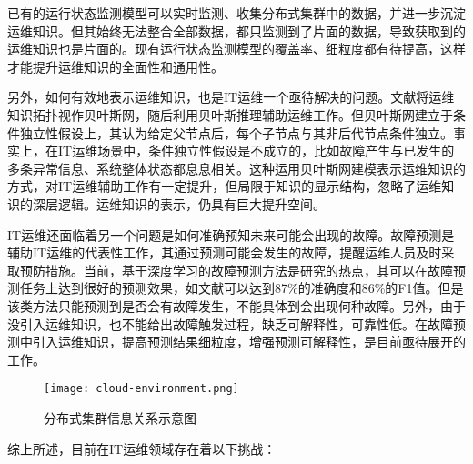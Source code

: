已有的运行状态监测模型\cite{wang2019grano,nie2016mining-causality-graph,qiu2020causality-mining-knowledge-graph}可以实时监测、收集分布式集群中的数据，并进一步沉淀运维知识。但其始终无法整合全部数据，都只监测到了片面的数据，导致获取到的运维知识也是片面的。现有运行状态监测模型的覆盖率、细粒度都有待提高，这样才能提升运维知识的全面性和通用性。

另外，如何有效地表示运维知识，也是IT运维一个亟待解决的问题。文献\parencite{nie2016mining-causality-graph,qiu2020causality-mining-knowledge-graph,tan2012prepare}将运维知识拓扑视作贝叶斯网，随后利用贝叶斯推理辅助运维工作。但贝叶斯网建立于条件独立性假设上，其认为给定父节点后，每个子节点与其非后代节点条件独立。事实上，在IT运维场景中，条件独立性假设是不成立的，比如故障产生与已发生的多条异常信息、系统整体状态都息息相关。这种运用贝叶斯网建模表示运维知识的方式，对IT运维辅助工作有一定提升，但局限于知识的显示结构，忽略了运维知识的深层逻辑。运维知识的表示，仍具有巨大提升空间。

IT运维还面临着另一个问题是如何准确预知未来可能会出现的故障。故障预测是辅助IT运维的代表性工作，其通过预测可能会发生的故障，提醒运维人员及时采取预防措施。当前，基于深度学习的故障预测方法\cite{xu2016health,cheng2018machine,du2017deeplog,das2018desh,islam2017predicting,li2020predicting,gao2020task}是研究的热点，其可以在故障预测任务上达到很好的预测效果，如文献\parencite{gao2020task}可以达到87\%的准确度和86\%的F1值。但是该类方法只能预测到是否会有故障发生，不能具体到会出现何种故障。另外，由于没引入运维知识，也不能给出故障触发过程，缺乏可解释性，可靠性低。在故障预测中引入运维知识，提高预测结果细粒度，增强预测可解释性，是目前亟待展开的工作。

\begin{figure}[htbp]
    \centering
    \texttt{[image: cloud-environment.png]}
    \caption{分布式集群信息关系示意图\label{cloud-environment}}
\end{figure}

综上所述，目前在IT运维领域存在着以下挑战：

